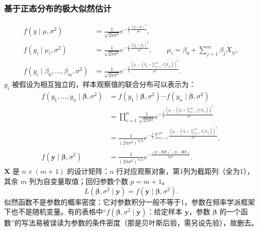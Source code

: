 \subsubsection{基于正态分布的极大似然估计}
\begin{align*}
f(y\mid\mu,\sigma^2)&=\frac1{\sqrt{2\pi\sigma^2}}
 e^{-\frac12\frac{(y-\mu)^2}{\sigma^2}},\\
f(y_i\mid\mu_i,\sigma^2)&=\frac1{\sqrt{2\pi\sigma^2}}
 e^{-\frac12\frac{(y_i-\mu_i)^2}{\sigma^2}},\qquad
\mu_i=\beta_0+\sum_{j=1}^m\beta_jX_{ij},\\
f(y_i\mid\beta_0,\ldots,\beta_m,\sigma^2)&=\frac1{\sqrt{2\pi\sigma^2}}
 e^{-\frac12\frac{(y_i-(\beta_0+\sum_{j=1}^m\beta_jX_{ij}))^2}{\sigma^2}}.
\end{align*}
$y_i$ 被假设为相互独立的，样本观察值的联合分布可以表示为：
\begin{align*}
f(y_1,\ldots,y_n\mid\bm\beta,\sigma^2)
&=f(y_1\mid\bm\beta,\sigma^2)\cdots f(y_n\mid\bm\beta,\sigma^2)\\
&=\prod_{i=1}^n\frac1{\sqrt{2\pi\sigma^2}}
 e^{-\frac12\frac{(y_i-(\beta_0+\sum_{j=1}^m\beta_jX_{ij}))^2}{\sigma^2}}\\
&=\frac1{(2\pi\sigma^2)^{n/2}}
 e^{-\frac12\sum_{i=1}^n\frac{(y_i-(\beta_0+\sum_{j=1}^m\beta_jX_{ij}))^2}{\sigma^2}},\\
f(\bm y\mid\bm\beta,\sigma^2)&=\frac1{(2\pi\sigma^2)^{n/2}}
 e^{-\frac{(\bm y-\bm X\bm\beta)^\top(\bm y-\bm X\bm\beta)}{2\sigma^2}}.
\end{align*}
$\bm X$ 是 $n\times(m+1)$ 的设计矩阵：$n$ 行对应观察对象，第1列为截距列（全为1），其余 $m$ 列为自变量取值；回归参数个数 $p=m+1$。
\[
L(\bm\beta,\sigma^2\mid\bm y)=f(\bm y\mid\bm\beta,\sigma^2).
\]
似然函数不是参数的概率密度：它对参数积分一般不等于1，参数在频率学派框架下也不是随机变量。有的表格中“$f(\bm\beta,\sigma^2\mid\bm y)$：给定样本 $\bm y$，参数 $\bm\beta$ 的一个函数”的写法易被误读为参数的条件密度（那是贝叶斯后验，需另设先验），故删去。

